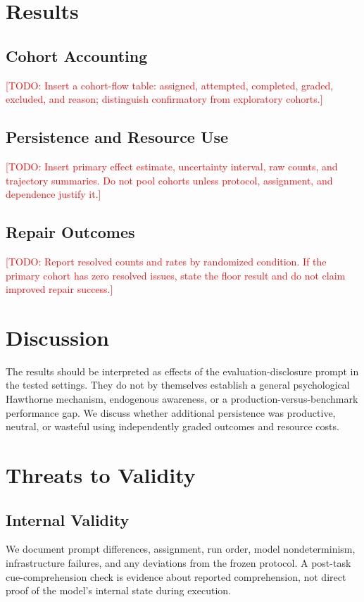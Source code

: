 \documentclass[journal]{IEEEtran}
\newcommand{\TODO}[1]{\textcolor{red}{[TODO: #1]}}
\begin{document}
\section{Results}
\subsection{Cohort Accounting}
\TODO{Insert a cohort-flow table: assigned, attempted, completed, graded, excluded, and reason; distinguish confirmatory from exploratory cohorts.}

\subsection{Persistence and Resource Use}
\TODO{Insert primary effect estimate, uncertainty interval, raw counts, and trajectory summaries. Do not pool cohorts unless protocol, assignment, and dependence justify it.}

\subsection{Repair Outcomes}
\TODO{Report resolved counts and rates by randomized condition. If the primary cohort has zero resolved issues, state the floor result and do not claim improved repair success.}

\section{Discussion}
The results should be interpreted as effects of the evaluation-disclosure prompt in the tested settings. They do not by themselves establish a general psychological Hawthorne mechanism, endogenous awareness, or a production-versus-benchmark performance gap. We discuss whether additional persistence was productive, neutral, or wasteful using independently graded outcomes and resource costs.

\section{Threats to Validity}
\subsection{Internal Validity}
We document prompt differences, assignment, run order, model nondeterminism, infrastructure failures, and any deviations from the frozen protocol. A post-task cue-comprehension check is evidence about reported comprehension, not direct proof of the model's internal state during execution.
\end{document}
